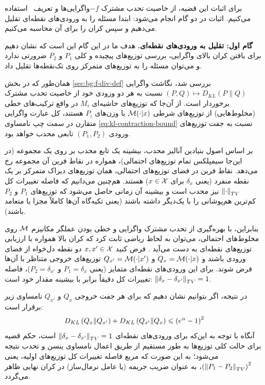 \begin{اثبات}
برای اثبات این قضیه، از خاصیت تحدب مشترک $-f$واگرایی‌ها و تعریف \LDP\ استفاده می‌کنیم. اثبات در دو گام انجام می‌شود: ابتدا مسئله را به ورودی‌های نقطه‌ای تقلیل می‌دهیم و سپس کران را برای آن محاسبه می‌کنیم.

\textbf{گام اول: تقلیل به ورودی‌های نقطه‌ای.}
هدف ما در این گام این است که نشان دهیم برای یافتن کران بالای واگرایی، بررسی توزیع‌های پیچیده و کلی $P_1$ و $P_2$ ضرورتی ندارد و می‌توان مسئله را به توزیع‌های متمرکز روی تک‌نقطه‌ها تقلیل داد.

همان‌طور که در بخش \ref{sec:bg:f-div-def} بررسی شد، نگاشت واگرایی $(P, Q) \mapsto D_{KL}\left(P \| Q\right)$ نسبت به هر دو ورودی خود از خاصیت تحدب مشترک برخوردار است. از آن‌جا که توزیع‌های حاشیه‌ای $M_i$ در واقع ترکیب‌های خطی (مخلوط‌هایی) از توزیع‌های شرطی $\mech(\cdot|x)$ با وزن‌های $P_i$ هستند، کل عبارت واگرایی متقارن در سمت چپ نامساوی \eqref{eq:kl-contraction-bound} نسبت به جفت توزیع‌های ورودی $(P_1, P_2)$ تابعی محدب خواهد بود. 

بر اساس اصول بنیادین آنالیز محدب، بیشینه یک تابع محدب بر روی یک مجموعه (در این‌جا سیمپلکس تمام توزیع‌های احتمالی)، همواره در نقاط فرین آن مجموعه رخ می‌دهد. نقاط فرین در فضای توزیع‌های احتمالی، همان توزیع‌های دیراک متمرکز بر یک نقطه منفرد (یعنی $\delta_x$ برای $x \in \Xset$) هستند. هم‌چنین می‌دانیم که فاصله تغییرات کل $\left\lVert\cdot\right\rVert_{TV}$ نیز محدب است و بیشینه آن زمانی حاصل می‌شود که توزیع‌های $P_1$ و $P_2$ کم‌ترین هم‌پوشانی را با یک‌دیگر داشته باشند (یعنی تکیه‌گاه آن‌ها کاملاً مجزا یا متعامد باشند).

بنابراین، با بهره‌گیری از تحدب مشترک واگرایی و خطی بودن عملگر مکانیزم $\mech$ روی مخلوط‌های احتمالی، می‌توان به لحاظ ریاضی ثابت کرد که کران بالا همواره با ارزیابی توزیع‌های نقطه‌ای به دست می‌آید \cite{Duchi2013}. فرض کنید $x, x' \in \Xset$ دو نقطه دل‌خواه از فضای ورودی باشند و $Q_x = \mech(\cdot|x)$ و $Q_{x'} = \mech(\cdot|x')$ توزیع‌های خروجی متناظر با آن‌ها فرض شوند. برای این ورودی‌های نقطه‌ای متمایز (یعنی $P_1 = \delta_x$ و $P_2 = \delta_{x'}$)، فاصله تغییرات کل دقیقاً برابر با بیشینه مقدار خود است: $\left\lVert\delta_x - \delta_{x'}\right\rVert_{TV} = 1$. 

در نتیجه، اگر بتوانیم نشان دهیم که برای هر جفت خروجی $Q_x$ و $Q_{x'}$ نامساوی زیر برقرار است:
\begin{equation}
D_{KL}\left(Q_x \| Q_{x'}\right) + D_{KL}\left(Q_{x'} \| Q_x\right) \leqslant \left(e^{\alpha} - 1\right)^2
\end{equation}
آنگاه با توجه به این‌که برای ورودی‌های نقطه‌ای $\left\lVert\delta_x - \delta_{x'}\right\rVert_{TV} = 1$ است، حکم قضیه برای حالت کلی توزیع‌ها به طور مستقیم از طریق اعمال نامساوی ینسن و تحدب نتیجه می‌شود؛ به این صورت که مربع فاصله تغییرات کل توزیع‌های اولیه، یعنی $\left(\left\lVert P_1 - P_2\right\rVert_{TV}\right)^2$، به عنوان ضریب جریمه (یا عامل نرمال‌ساز) در کران نهایی ظاهر می‌گردد.


\end{اثبات}
